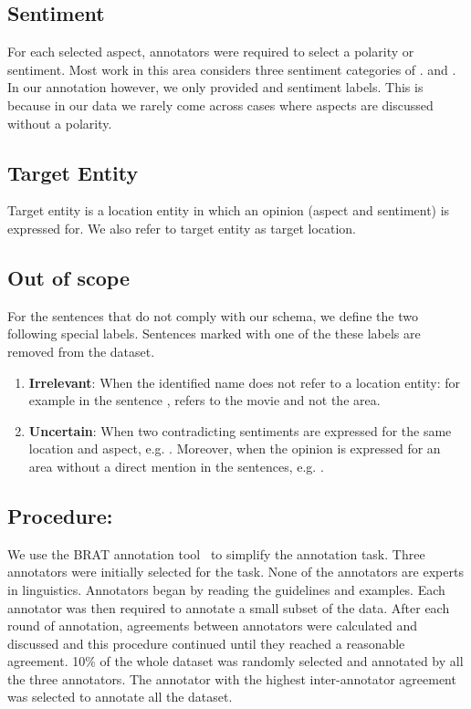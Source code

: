 \documentclass[11pt]{article}
\begin{document}
    \subsection{Sentiment}
    For each selected aspect, annotators were required to select a polarity or sentiment. Most work in this area considers three sentiment categories of .  and . In our annotation however, we only provided  and  sentiment labels. This is because in our data we rarely come across cases where aspects are discussed without a polarity. 

    \subsection{Target Entity}
    Target entity is a location entity in which an opinion (aspect and sentiment) is expressed for. We also refer to target entity as target location.  
    
    \subsection{Out of scope}
    For the sentences that do not comply with our schema, we define the two following special labels. Sentences marked with one of the these labels are removed from the dataset.
    \begin{enumerate}
    \item \textbf{Irrelevant}: When the identified name does not refer to a location entity: for example in the sentence ,  refers to the movie and not the area.
    \item \textbf{Uncertain}: When two contradicting sentiments are expressed for the same location and aspect, e.g. . Moreover, when the opinion is expressed for an area without a direct mention in the sentences, e.g. .
    \end{enumerate}

    \subsection{Procedure:} 
     We use the BRAT annotation tool~\cite{stenetorp2012brat} to simplify the annotation task. Three annotators were initially selected for the task. None of the annotators are experts in linguistics. Annotators began by reading the guidelines and examples. Each annotator was then required to annotate a small subset of the data. After each round of annotation, agreements between annotators were calculated and discussed and this procedure continued until they reached a reasonable agreement.
        10\% of the whole dataset was randomly selected and annotated by all the three annotators. The annotator with the highest inter-annotator agreement was selected to annotate all the dataset. %
\end{document}
